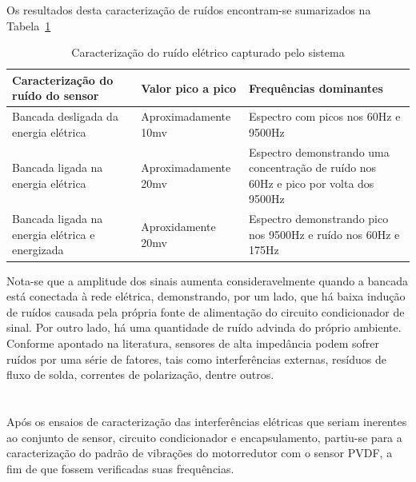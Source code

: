 \documentclass[
	12pt,				
	oneside,			
	a4paper,			
	english,			
	brazil,	
	sumario=abnt-6027-2012		
	]{abntex2ppgsi}
\begin{document}
{{{{{{{Os resultados desta caracterização de ruídos encontram-se sumarizados na Tabela~\ref{tab:caraterizaçãoSinal}

\begin{table}[h]
\caption{Caracterização do ruído elétrico capturado pelo sistema}
\begin{tabularx}{\textwidth}{|X|X|X|}
\hline
Caracterização do ruído do sensor               & Valor pico a pico    & Frequências dominantes                                                               \\ \hline
Bancada desligada da energia elétrica           & Aproximadamente 10mv  & Espectro com picos nos 60Hz e 9500Hz                                                           \\ \hline
Bancada ligada na energia elétrica              & Aproximadamente 20mv & Espectro demonstrando uma concentração de ruído nos 60Hz e pico por volta dos 9500Hz \\ \hline
Bancada ligada na energia elétrica e energizada & Aproxidamente 20mv  & Espectro demonstrando pico nos 9500Hz e ruído nos 60Hz e 175Hz           \\ \hline
\end{tabularx}
\label{tab:caraterizaçãoSinal}
\end{table}

Nota-se que a amplitude dos sinais aumenta consideravelmente quando a bancada está conectada à rede elétrica, demonstrando, por um lado, que há baixa indução de ruídos causada pela própria fonte de alimentação do circuito condicionador de sinal. Por outro lado, há uma quantidade de ruído advinda do próprio ambiente. Conforme apontado na literatura, sensores de alta impedância podem sofrer ruídos por uma série de fatores, tais como interferências externas, resíduos de fluxo de solda, correntes de polarização, dentre outros. %

\section{}

Após os ensaios de caracterização das interferências elétricas que seriam inerentes ao conjunto de sensor, circuito condicionador e encapsulamento, partiu-se para a caracterização do padrão de vibrações do motorredutor com o sensor PVDF, a fim de que fossem verificadas suas frequências. 

}}}}}}}
\end{document}
